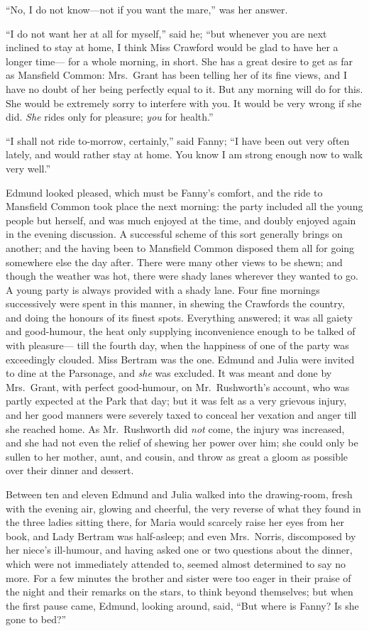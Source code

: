 \documentclass{article}
\begin{document}
``No, I do not know---not if you want the mare,'' was her answer.

``I do not want her at all for myself,'' said he;
``but whenever you are next inclined to stay at home,
I think Miss Crawford would be glad to have her a longer time---%
for a whole morning, in short.  She has a great desire to get
as far as Mansfield Common:  Mrs.\ Grant has been telling
her of its fine views, and I have no doubt of her being
perfectly equal to it.  But any morning will do for this.
She would be extremely sorry to interfere with you.
It would be very wrong if she did.  \emph{She} rides only
for pleasure; \emph{you} for health.''

``I shall not ride to-morrow, certainly,'' said Fanny;
``I have been out very often lately, and would rather
stay at home.  You know I am strong enough now to walk
very well.''

Edmund looked pleased, which must be Fanny's comfort,
and the ride to Mansfield Common took place the next morning:
the party included all the young people but herself,
and was much enjoyed at the time, and doubly enjoyed
again in the evening discussion.  A successful scheme
of this sort generally brings on another; and the having
been to Mansfield Common disposed them all for going
somewhere else the day after.  There were many other
views to be shewn; and though the weather was hot,
there were shady lanes wherever they wanted to go.
A young party is always provided with a shady lane.
Four fine mornings successively were spent in this manner,
in shewing the Crawfords the country, and doing the
honours of its finest spots.  Everything answered;
it was all gaiety and good-humour, the heat only supplying
inconvenience enough to be talked of with pleasure---%
till the fourth day, when the happiness of one of the party
was exceedingly clouded.  Miss Bertram was the one.
Edmund and Julia were invited to dine at the Parsonage,
and \emph{she} was excluded.  It was meant and done by Mrs.\ Grant,
with perfect good-humour, on Mr.\ Rushworth's account,
who was partly expected at the Park that day; but it was felt
as a very grievous injury, and her good manners were severely
taxed to conceal her vexation and anger till she reached home.
As Mr.\ Rushworth did \emph{not} come, the injury was increased,
and she had not even the relief of shewing her power over him;
she could only be sullen to her mother, aunt, and cousin,
and throw as great a gloom as possible over their dinner
and dessert.

Between ten and eleven Edmund and Julia walked into the
drawing-room, fresh with the evening air, glowing and cheerful,
the very reverse of what they found in the three ladies
sitting there, for Maria would scarcely raise her eyes
from her book, and Lady Bertram was half-asleep; and even
Mrs.\ Norris, discomposed by her niece's ill-humour,
and having asked one or two questions about the dinner,
which were not immediately attended to, seemed almost
determined to say no more.  For a few minutes the brother
and sister were too eager in their praise of the night
and their remarks on the stars, to think beyond themselves;
but when the first pause came, Edmund, looking around,
said, ``But where is Fanny?  Is she gone to bed?''
\end{document}
